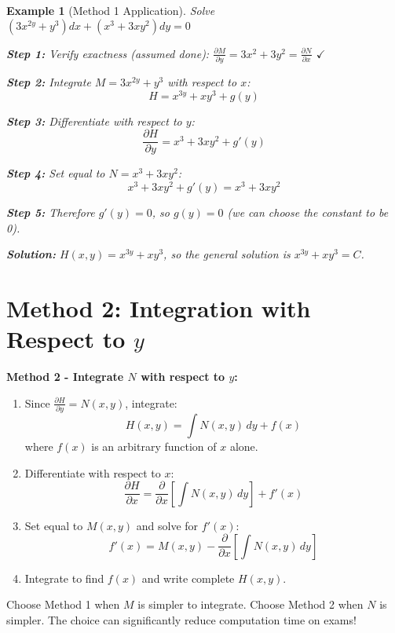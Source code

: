 \documentclass[12pt]{article}
\newtheorem{example}{Example}
\begin{document}
\begin{example}[Method 1 Application]
Solve $(3x^{2y} + y^{3})dx + (x^{3} + 3xy^{2})dy = 0$

\textbf{Step 1:} Verify exactness (assumed done): $\frac{\partial M}{\partial y} = 3x^{2} + 3y^{2} = \frac{\partial N}{\partial x}$ $\checkmark$

\textbf{Step 2:} Integrate $M = 3x^{2y} + y^{3}$ with respect to $x$:
\[H = x^{3y} + xy^{3} + g(y)\]

\textbf{Step 3:} Differentiate with respect to $y$:
\[\frac{\partial H}{\partial y} = x^{3} + 3xy^{2} + g'(y)\]

\textbf{Step 4:} Set equal to $N = x^{3} + 3xy^{2}$:
\[x^{3} + 3xy^{2} + g'(y) = x^{3} + 3xy^{2}\]

\textbf{Step 5:} Therefore $g'(y) = 0$, so $g(y) = 0$ (we can choose the constant to be 0).

\textbf{Solution:} $H(x,y) = x^{3y} + xy^{3}$, so the general solution is $x^{3y} + xy^{3} = C$.
\end{example}

\section{Method 2: Integration with Respect to $y$}

\begin{algorithm}
\textbf{Method 2 - Integrate $N$ with respect to $y$:}
\begin{enumerate}
    \item Since $\frac{\partial H}{\partial y} = N(x,y)$, integrate:
    \[H(x,y) = \int N(x,y)\,dy + f(x)\]
    where $f(x)$ is an arbitrary function of $x$ alone.

    \item Differentiate with respect to $x$:
    \[\frac{\partial H}{\partial x} = \frac{\partial}{\partial x}\left[\int N(x,y)\,dy\right] + f'(x)\]

    \item Set equal to $M(x,y)$ and solve for $f'(x)$:
    \[f'(x) = M(x,y) - \frac{\partial}{\partial x}\left[\int N(x,y)\,dy\right]\]

    \item Integrate to find $f(x)$ and write complete $H(x,y)$.
\end{enumerate}
\end{algorithm}

\begin{insight}
Choose Method 1 when $M$ is simpler to integrate. Choose Method 2 when $N$ is simpler. The choice can significantly reduce computation time on exams!
\end{insight}
\end{document}
